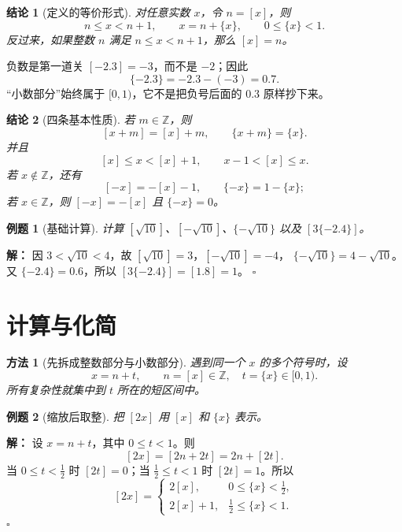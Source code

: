 \documentclass[11pt,a4paper,fontset=fandol]{ctexart}
\theoremstyle{formaltheorem}
\newtheorem{theorem}{结论}[section]
\newtheorem{method}{方法}[section]
\theoremstyle{formalexample}
\newtheorem{example}{例题}[section]
\newenvironment{solution}{\par\noindent\textbf{解：}}{\hfill$\square$\par}
\begin{document}
\begin{theorem}[定义的等价形式]
对任意实数 $x$，令 $n=[x]$，则
\[
n\le x<n+1,\qquad x=n+\{x\},\qquad 0\le\{x\}<1.
\]
反过来，如果整数 $n$ 满足 $n\le x<n+1$，那么 $[x]=n$。
\end{theorem}

\begin{notebox}{负数是第一道关}
$[-2.3]=-3$，而不是 $-2$；因此
\[
\{-2.3\}=-2.3-(-3)=0.7.
\]
“小数部分”始终属于 $[0,1)$，它不是把负号后面的 $0.3$ 原样抄下来。
\end{notebox}

\begin{theorem}[四条基本性质]
若 $m\in\mathbb Z$，则
\[
[x+m]=[x]+m,\qquad \{x+m\}=\{x\}.
\]
并且
\[
[x]\le x<[x]+1,\qquad x-1<[x]\le x.
\]
若 $x\notin\mathbb Z$，还有
\[
[-x]=-[x]-1,\qquad \{-x\}=1-\{x\};
\]
若 $x\in\mathbb Z$，则 $[-x]=-[x]$ 且 $\{-x\}=0$。
\end{theorem}

\begin{example}[基础计算]
计算 $[\sqrt{10}]$、$[-\sqrt{10}]$、$\{-\sqrt{10}\}$ 以及 $[3\{ -2.4\}]$。
\end{example}
\begin{solution}
因 $3<\sqrt{10}<4$，故 $[\sqrt{10}]=3$，$[-\sqrt{10}]=-4$，
$\{-\sqrt{10}\}=4-\sqrt{10}$。又 $\{-2.4\}=0.6$，所以 $[3\{-2.4\}]=[1.8]=1$。
\end{solution}

\section{计算与化简}
\begin{method}[先拆成整数部分与小数部分]
遇到同一个 $x$ 的多个符号时，设
\[
x=n+t,\qquad n=[x]\in\mathbb Z,\quad t=\{x\}\in[0,1).
\]
所有复杂性就集中到 $t$ 所在的短区间中。
\end{method}

\begin{example}[缩放后取整]
把 $[2x]$ 用 $[x]$ 和 $\{x\}$ 表示。
\end{example}
\begin{solution}
设 $x=n+t$，其中 $0\le t<1$。则
\[
[2x]=[2n+2t]=2n+[2t].
\]
当 $0\le t<\tfrac12$ 时 $[2t]=0$；当 $\tfrac12\le t<1$ 时 $[2t]=1$。所以
\[
[2x]=\begin{cases}2[x],&0\le\{x\}<\tfrac12,\\2[x]+1,&\tfrac12\le\{x\}<1.\end{cases}
\]
\end{solution}
\end{document}
